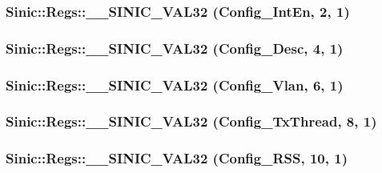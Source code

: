 \label{namespaceSinic_1_1Regs_aa64e553e52828eeabd7a0f7a34df493a}
\hypertarget{namespaceSinic_1_1Regs_afe2cd4380ee1a5e6f351a5396245bcf0}{
\subsubsection[{\_\-\_\-SINIC\_\-VAL32}]{\setlength{\rightskip}{0pt plus 5cm}Sinic::Regs::\_\-\_\-SINIC\_\-VAL32 (Config\_\-IntEn, \/  2, \/  1)}}
\label{namespaceSinic_1_1Regs_afe2cd4380ee1a5e6f351a5396245bcf0}
\hypertarget{namespaceSinic_1_1Regs_ae0fbc614549507f08a2a4b846eb72bf2}{
\subsubsection[{\_\-\_\-SINIC\_\-VAL32}]{\setlength{\rightskip}{0pt plus 5cm}Sinic::Regs::\_\-\_\-SINIC\_\-VAL32 (Config\_\-Desc, \/  4, \/  1)}}
\label{namespaceSinic_1_1Regs_ae0fbc614549507f08a2a4b846eb72bf2}
\hypertarget{namespaceSinic_1_1Regs_aa007f0659c38ef204cfffe32396ea15e}{
\subsubsection[{\_\-\_\-SINIC\_\-VAL32}]{\setlength{\rightskip}{0pt plus 5cm}Sinic::Regs::\_\-\_\-SINIC\_\-VAL32 (Config\_\-Vlan, \/  6, \/  1)}}
\label{namespaceSinic_1_1Regs_aa007f0659c38ef204cfffe32396ea15e}
\hypertarget{namespaceSinic_1_1Regs_a93862c2608fa0c0f83c8fa0972936784}{
\subsubsection[{\_\-\_\-SINIC\_\-VAL32}]{\setlength{\rightskip}{0pt plus 5cm}Sinic::Regs::\_\-\_\-SINIC\_\-VAL32 (Config\_\-TxThread, \/  8, \/  1)}}
\label{namespaceSinic_1_1Regs_a93862c2608fa0c0f83c8fa0972936784}
\hypertarget{namespaceSinic_1_1Regs_a76178a015709c6e9dd675896de3e34c9}{
\subsubsection[{\_\-\_\-SINIC\_\-VAL32}]{\setlength{\rightskip}{0pt plus 5cm}Sinic::Regs::\_\-\_\-SINIC\_\-VAL32 (Config\_\-RSS, \/  10, \/  1)}}

